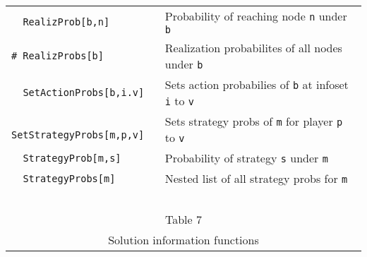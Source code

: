\begin{table}[htp]
\begin{center}
\begin{tabular} {|l||l|}
\verb+  RealizProb[b,n]+ & Probability of reaching node \verb+n+ under \verb+b+\\
\verb+# RealizProbs[b]+ & Realization probabilites of all nodes under \verb+b+\\ 
\verb+  SetActionProbs[b,i.v]+ & Sets action probabilies of \verb+b+ at infoset \verb+i+ to \verb+v+\\
\verb+  SetStrategyProbs[m,p,v]+ & Sets strategy probs of \verb+m+ for
player \verb+p+ to \verb+v+\\
\verb+  StrategyProb[m,s]+ & Probability of strategy \verb+s+ under \verb+m+ \\
\verb+  StrategyProbs[m]+ & Nested list of all strategy probs for \verb+m+\\
\hline
\multicolumn{2}{c}{\ }\\
\multicolumn{2}{c}{Table 7}\\
\multicolumn{2}{c}{Solution information functions}\\
\end{tabular}
\end{center}
\end{table}
\medskip

